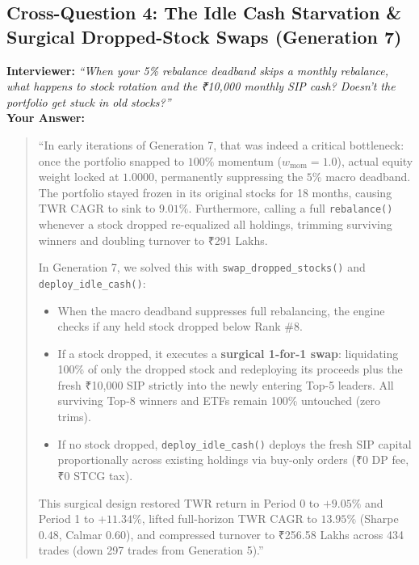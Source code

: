 \documentclass[11pt,a4paper]{article}
\begin{document}
\subsection{Cross-Question 4: The Idle Cash Starvation \& Surgical Dropped-Stock Swaps (Generation 7)}
\textbf{Interviewer:} \textit{``When your 5\% rebalance deadband skips a monthly rebalance, what happens to stock rotation and the ₹10,000 monthly SIP cash? Doesn't the portfolio get stuck in old stocks?''} \\
\textbf{Your Answer:}
\begin{quote}
``In early iterations of Generation 7, that was indeed a critical bottleneck: once the portfolio snapped to $100\%$ momentum ($w_{\text{mom}} = 1.0$), actual equity weight locked at $1.0000$, permanently suppressing the $5\%$ macro deadband. The portfolio stayed frozen in its original stocks for 18 months, causing TWR CAGR to sink to $9.01\%$. Furthermore, calling a full \texttt{rebalance()} whenever a stock dropped re-equalized all holdings, trimming surviving winners and doubling turnover to ₹291 Lakhs.

In Generation 7, we solved this with \texttt{swap\_dropped\_stocks()} and \texttt{deploy\_idle\_cash()}:
\begin{itemize}
    \item When the macro deadband suppresses full rebalancing, the engine checks if any held stock dropped below Rank \#8.
    \item If a stock dropped, it executes a \textbf{surgical 1-for-1 swap}: liquidating 100\% of only the dropped stock and redeploying its proceeds plus the fresh ₹10,000 SIP strictly into the newly entering Top-5 leaders. All surviving Top-8 winners and ETFs remain 100\% untouched (zero trims).
    \item If no stock dropped, \texttt{deploy\_idle\_cash()} deploys the fresh SIP capital proportionally across existing holdings via buy-only orders (₹0 DP fee, ₹0 STCG tax).
\end{itemize}
This surgical design restored TWR return in Period 0 to $+9.05\%$ and Period 1 to $+11.34\%$, lifted full-horizon TWR CAGR to $13.95\%$ (Sharpe $0.48$, Calmar $0.60$), and compressed turnover to ₹256.58 Lakhs across 434 trades (down 297 trades from Generation 5).''
\end{quote}
\end{document}

